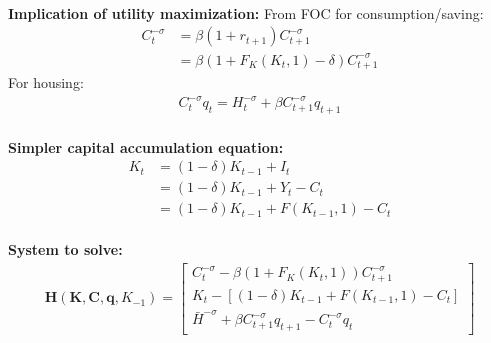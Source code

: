 \documentclass{article}
\begin{document}
\\
\textbf{Implication of utility maximization:} From FOC for consumption/saving:
$$
\begin{aligned}
	C_{t}^{-\sigma}&=\beta(1+r_{t+1})C_{t+1}^{-\sigma} \\
	&=\beta(1+F_{K}(K_{t},1)-\delta)C_{t+1}^{-\sigma}
\end{aligned}
$$
For housing: 
\begin{align*}
	C_t^{-\sigma}q_t = H_t^{-\sigma} + \beta C_{t+1}^{-\sigma}q_{t+1}
\end{align*}
\\
\textbf{Simpler capital accumulation equation:}
$$
\begin{aligned}
	K_{t} &= (1-\delta)K_{t-1}+I_{t} \\
	&= (1-\delta)K_{t-1}+Y_{t}-C_{t} \\
	&= (1-\delta)K_{t-1} + F(K_{t-1},1)-C_{t}
\end{aligned}
$$ 
\\
\textbf{System to solve:}
$$
\begin{aligned}
	\boldsymbol{H}(\boldsymbol{K},\boldsymbol{C},\boldsymbol{q},K_{-1})
	=\left[\begin{array}{c}
		C_{t}^{-\sigma}-\beta(1+F_{K}(K_{t},1))C_{t+1}^{-\sigma}\\
		K_{t}-[(1-\delta)K_{t-1} + F(K_{t-1},1)-C_{t}] \\ 
		\bar{H}^{-\sigma} + \beta C_{t+1}^{-\sigma}q_{t+1} - C_t^{-\sigma}q_t
	\end{array}\right]
\end{aligned}
$$
\end{document}
